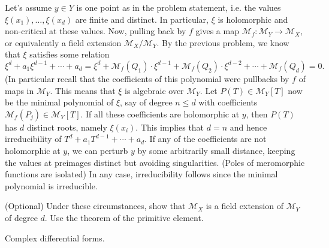 \documentclass{lkx_pset}
\begin{document}
\begin{solution}
  Let's assume $y\in Y$ is one point as in the problem statement, i.e. the values $\xi(x_1),\ldots, \xi(x_d)$ are finite and distinct. In particular, $\xi$ is holomorphic and non-critical at these values.
  Now, pulling back by $f$ gives a map $\mathcal{M}_f : \mathcal{M}_Y \to \mathcal{M}_X$, or equivalently a field extension $\mathcal{M}_X/\mathcal{M}_Y$. By the previous problem, we know that $\xi$ satisfies some relation
  \[
    \xi^d + a_1\xi^{d-1}+\cdots+a_d=\xi^d + \mathcal{M}_f(Q_1)\cdot  \xi^{d-1} + \mathcal{M}_f(Q_2)\cdot \xi^{d-2}+ \cdots + \mathcal{M}_f(Q_d) = 0.
  \]
  (In particular recall that the coefficients of this polynomial were pullbacks by $f$ of maps in $\mathcal{M}_Y$. This means that $\xi$ is algebraic over $\mathcal{M}_Y$. Let $P(T)\in \mathcal{M}_Y[T]$ now be the minimal polynomial of $\xi$, say of degree $n \leq d$ with coefficients $\mathcal{M}_f(P_j)\in \mathcal{M}_Y[T]$. If all these coefficients are holomorphic at $y$, then $P(T)$ has $d$ distinct roots, namely $\xi(x_i)$. This implies that $d=n$ and hence irreducibility of $T^d + a_1T^{d-1} + \cdots + a_d$. If any of the coefficients are not holomorphic at $y$, we can perturb $y$ by some arbitrarily small distance, keeping the values at preimages distinct but avoiding singularities. (Poles of meromorphic functions are isolated) In any case, irreducibility follows since the minimal polynomial is irreducible.

  \begin{part}{(Optional)}
    Under these circumstances, show that $\mathcal{M}_X$ is a field extension of $\mathcal{M}_Y$ of degree $d$. Use the theorem of the primitive element.
  \end{part}
\end{solution}

\begin{problem}{5}
  Complex differential forms.
\end{problem}
\end{document}
